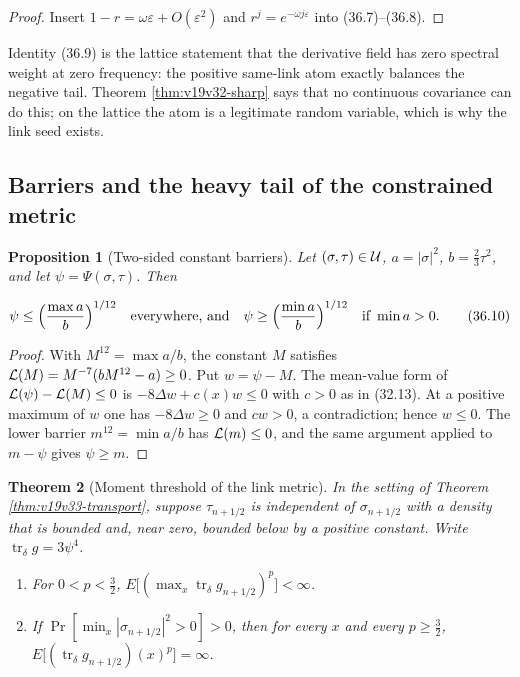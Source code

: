 \documentclass[11pt]{article}
\newtheorem{theorem}{Theorem}[section]
\newtheorem{proposition}[theorem]{Proposition}
\theoremstyle{remark}
\begin{document}
\begin{proof}
Insert \(1-r=\omega\varepsilon+O(\varepsilon^2)\) and
\(r^{j}=e^{-\omega j\varepsilon}\) into (36.7)--(36.8).
\end{proof}

Identity (36.9) is the lattice statement that the derivative field has
zero spectral weight at zero frequency: the positive same-link atom
exactly balances the negative tail.  Theorem \ref{thm:v19v32-sharp}
says that no continuous covariance can do this; on the lattice the atom
is a legitimate random variable, which is why the link seed exists.

\subsection{Barriers and the heavy tail of the constrained metric}

\begin{proposition}[Two-sided constant barriers]
\label{prop:v19v33-barriers}
Let \((\sigma,\tau)\in{\cal U}\), \(a=|\sigma|^2\), \(b=\tfrac23\tau^2\),
and let \(\psi=\Psi(\sigma,\tau)\).  Then

\[
 \psi\leq\Bigl(\frac{\max a}{b}\Bigr)^{1/12}
 \quad\hbox{everywhere, and}\quad
 \psi\geq\Bigl(\frac{\min a}{b}\Bigr)^{1/12}
 \quad\hbox{if }\min a>0.                                        \tag{36.10}
\]
\end{proposition}

\begin{proof}
With \(M^{12}=\max a/b\), the constant \(M\) satisfies
\({\cal L}(M)=M^{-7}(bM^{12}-a)\geq0\).  Put \(w=\psi-M\).  The
mean-value form of \({\cal L}(\psi)-{\cal L}(M)\leq0\) is
\(-8\Delta w+c(x)w\leq0\) with \(c>0\) as in (32.13).  At a positive
maximum of \(w\) one has \(-8\Delta w\geq0\) and \(cw>0\), a
contradiction; hence \(w\leq0\).  The lower barrier
\(m^{12}=\min a/b\) has \({\cal L}(m)\leq0\), and the same argument
applied to \(m-\psi\) gives \(\psi\geq m\).
\end{proof}

\begin{theorem}[Moment threshold of the link metric]
\label{thm:v19v33-moments}
In the setting of Theorem \ref{thm:v19v33-transport}, suppose
\(\tau_{n+1/2}\) is independent of \(\sigma_{n+1/2}\) with a density
that is bounded and, near zero, bounded below by a positive constant.
Write \(\operatorname{tr}_\delta g=3\psi^4\).
\begin{enumerate}
\item For \(0<p<\tfrac32\),
      \(E\bigl[(\max_x\operatorname{tr}_\delta g_{n+1/2})^p\bigr]<\infty\).
\item If \(\Pr[\min_x|\sigma_{n+1/2}|^2>0]>0\), then for every
      \(x\) and every \(p\geq\tfrac32\),
      \(E\bigl[(\operatorname{tr}_\delta g_{n+1/2})(x)^p\bigr]=\infty\).
\end{enumerate}
\end{theorem}
\end{document}
